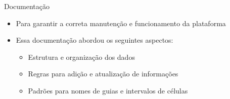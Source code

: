 \begin{frame}{Documentação}
    \begin{itemize}
        \item Para garantir a correta manutenção e funcionamento da plataforma \vspace{0.5cm}
        \item Essa documentação abordou os seguintes aspectos: \vspace{0.5cm}
              \begin{itemize}
                  \item Estrutura e organização dos dados \vspace{0.5cm}
                  \item Regras para adição e atualização de informações \vspace{0.5cm}
                  \item Padrões para nomes de guias e intervalos de células
              \end{itemize}
    \end{itemize}
\end{frame}